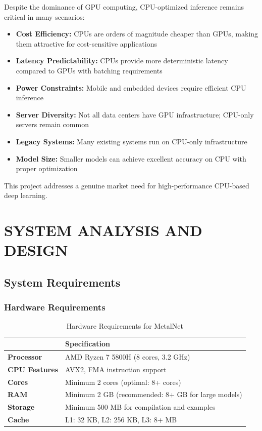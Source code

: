 \documentclass[12pt,oneside,a4paper]{report}
\newcommand{\hdr}{\rowcolor{mnHeaderBg}}
\newcommand{\hcell}[1]{{\bfseries\color{white}#1}}
\newcommand{\zebra}{\rowcolors{2}{mnRowA}{mnRowB}}
\newenvironment{ptable}[2]{%
  \begin{table}[H]\centering
  \caption{#1}%
  \vspace{2pt}%
  \zebra
  \setlength{\arrayrulewidth}{0.5pt}%
  \begin{tabular}{#2}\toprule}%
  {\bottomrule\end{tabular}\end{table}}
\begin{document}
Despite the dominance of GPU computing, CPU-optimized inference remains critical in many scenarios:

\begin{itemize}
    \item \textbf{Cost Efficiency:} CPUs are orders of magnitude cheaper than GPUs, making them attractive for cost-sensitive applications
    \item \textbf{Latency Predictability:} CPUs provide more deterministic latency compared to GPUs with batching requirements
    \item \textbf{Power Constraints:} Mobile and embedded devices require efficient CPU inference
    \item \textbf{Server Diversity:} Not all data centers have GPU infrastructure; CPU-only servers remain common
    \item \textbf{Legacy Systems:} Many existing systems run on CPU-only infrastructure
    \item \textbf{Model Size:} Smaller models can achieve excellent accuracy on CPU with proper optimization
\end{itemize}

This project addresses a genuine market need for high-performance CPU-based deep learning.

\newpage

\chapter{SYSTEM ANALYSIS AND DESIGN}

\section{System Requirements}

\subsection{Hardware Requirements}

\begin{ptable}{Hardware Requirements for MetalNet}{>{\bfseries\color{mnPrimary}}l l}
\hdr \hcell{Component} & \hcell{Specification} \\ \midrule
Processor    & AMD Ryzen 7 5800H (8 cores, 3.2 GHz) \\
CPU Features & AVX2, FMA instruction support \\
Cores        & Minimum 2 cores (optimal: 8+ cores) \\
RAM          & Minimum 2 GB (recommended: 8+ GB for large models) \\
Storage      & Minimum 500 MB for compilation and examples \\
Cache        & L1: 32 KB, L2: 256 KB, L3: 8+ MB \\
\end{ptable}
\end{document}
